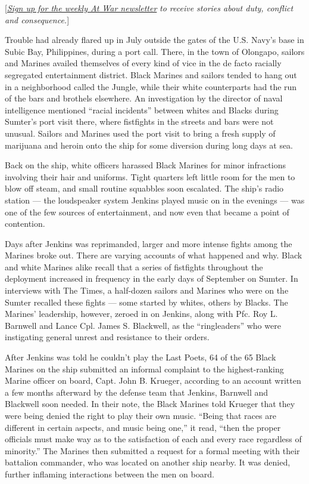 {[}\href{https://www.nytimes3xbfgragh.onion/newsletters/at-war}{\emph{Sign
up for the weekly At War newsletter}} \emph{to receive stories about
duty, conflict and consequence.}{]}

Trouble had already flared up in July outside the gates of the U.S.
Navy's base in Subic Bay, Philippines, during a port call. There, in the
town of Olongapo, sailors and Marines availed themselves of every kind
of vice in the de facto racially segregated entertainment district.
Black Marines and sailors tended to hang out in a neighborhood called
the Jungle, while their white counterparts had the run of the bars and
brothels elsewhere. An investigation by the director of naval
intelligence mentioned ``racial incidents'' between whites and Blacks
during Sumter's port visit there, where fistfights in the streets and
bars were not unusual. Sailors and Marines used the port visit to bring
a fresh supply of marijuana and heroin onto the ship for some diversion
during long days at sea.

Back on the ship, white officers harassed Black Marines for minor
infractions involving their hair and uniforms. Tight quarters left
little room for the men to blow off steam, and small routine squabbles
soon escalated. The ship's radio station --- the loudspeaker system
Jenkins played music on in the evenings --- was one of the few sources
of entertainment, and now even that became a point of contention.

Days after Jenkins was reprimanded, larger and more intense fights among
the Marines broke out. There are varying accounts of what happened and
why. Black and white Marines alike recall that a series of fistfights
throughout the deployment increased in frequency in the early days of
September on Sumter. In interviews with The Times, a half-dozen sailors
and Marines who were on the Sumter recalled these fights --- some
started by whites, others by Blacks. The Marines' leadership, however,
zeroed in on Jenkins, along with Pfc. Roy L. Barnwell and Lance Cpl.
James S. Blackwell, as the ``ringleaders'' who were instigating general
unrest and resistance to their orders.

After Jenkins was told he couldn't play the Last Poets, 64 of the 65
Black Marines on the ship submitted an informal complaint to the
highest-ranking Marine officer on board, Capt. John B. Krueger,
according to an account written a few months afterward by the defense
team that Jenkins, Barnwell and Blackwell soon needed. In their note,
the Black Marines told Krueger that they were being denied the right to
play their own music. ``Being that races are different in certain
aspects, and music being one,'' it read, ``then the proper officials
must make way as to the satisfaction of each and every race regardless
of minority.'' The Marines then submitted a request for a formal meeting
with their battalion commander, who was located on another ship nearby.
It was denied, further inflaming interactions between the men on board.

